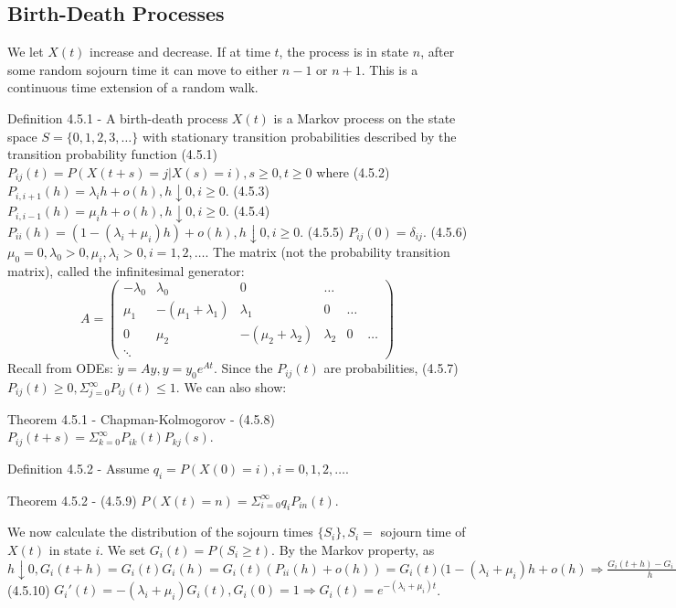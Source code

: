 \documentclass{article}
\begin{document}
\subsection{Birth-Death Processes}

We let $X(t)$ increase and decrease. If at time $t$, the process is in state $n$, after some random sojourn time it can move to either $n-1$ or $n+1$. This is a continuous time extension of a random walk.

Definition 4.5.1 - A birth-death process $X(t)$ is a Markov process on the state space $S = \{0, 1, 2, 3, \dots\}$ with stationary transition probabilities described by the transition probability function (4.5.1) $P_{ij}(t) = P(X(t+s)=j|X(s)=i), s \ge 0, t \ge 0$ where (4.5.2) $P_{i, i+1}(h) = \lambda_i h + o(h), h \downarrow 0, i \ge 0$. (4.5.3) $P_{i, i-1}(h) = \mu_i h + o(h), h \downarrow 0, i \ge 0$. (4.5.4) $P_{ii}(h) = (1-(\lambda_i + \mu_i)h) + o(h), h \downarrow 0, i \ge 0$. (4.5.5) $P_{ij}(0) = \delta_{ij}$. (4.5.6) $\mu_0 = 0, \lambda_0 > 0, \mu_i, \lambda_i > 0, i = 1, 2, \dots$. The matrix (not the probability transition matrix), called the infinitesimal generator: \begin{displaymath} A = \left( \begin{array}{llllllll} -\lambda_0 & \lambda_0 & 0 & \dots \\ \mu_1 & -(\mu_1 + \lambda_1) & \lambda_1 & 0 & \dots \\ 0 & \mu_2 & -(\mu_2 + \lambda_2) & \lambda_2 & 0 & \dots \\ \ddots \end{array} \right) \end{displaymath} Recall from ODEs: $\dot y = A y, y = y_0 e^{At}$. Since the $P_{ij}(t)$ are probabilities, (4.5.7) $P_{ij}(t) \ge 0, \Sigma_{j=0}^\infty P_{ij}(t) \le 1$. We can also show:

Theorem 4.5.1 - Chapman-Kolmogorov - (4.5.8) $P_{ij}(t+s) = \Sigma_{k=0}^\infty P_{ik}(t) P_{kj}(s)$.

Definition 4.5.2 - Assume $q_i = P(X(0) = i), i = 0, 1, 2, \dots$.

Theorem 4.5.2 - (4.5.9) $P(X(t)=n) = \Sigma_{i=0}^\infty q_i P_{in}(t)$.

We now calculate the distribution of the sojourn times $\{S_i\}, S_i =$ sojourn time of $X(t)$ in state $i$. We set $G_i(t) = P(S_i \ge t)$. By the Markov property, as $h \downarrow 0, G_i(t+h) = G_i(t) G_i(h) = G_i(t) (P_{ii}(h) + o(h)) = G_i(t) (1 - (\lambda_i + \mu_i) h + o(h) \Rightarrow \frac{G_i(t+h) - G_i(t)}{h} = -(\lambda_i + \mu_i)G_i(t) + o(1), h \rightarrow 0 \Rightarrow$ (4.5.10) $G_i'(t) = -(\lambda_i + \mu_i)G_i(t), G_i(0) = 1 \Rightarrow G_i(t) = e^{-(\lambda_i + \mu_i) t}$.
\end{document}
